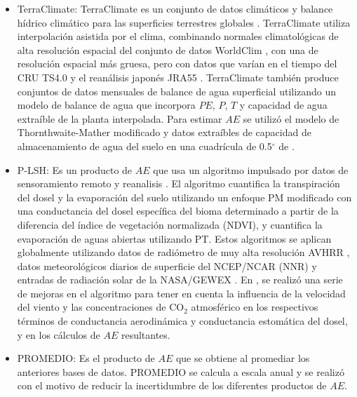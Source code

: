\documentclass[12pt]{article}
\begin{document}
\begin{itemize}
	\item TerraClimate: TerraClimate es un conjunto de datos climáticos y balance hídrico climático para las superficies terrestres globales \citep{abatzoglou2018terraclimate}. TerraClimate utiliza interpolación asistida por el clima, combinando normales climatológicas de alta resolución espacial del conjunto de datos WorldClim \citep{fick2017worldclim}, con una de resolución espacial más gruesa, pero con datos que varían en el tiempo del CRU TS4.0 \citep{harris2014updated} y el reanálisis japonés JRA55 \citep{kobayashi2015jra}. TerraClimate también produce conjuntos de datos mensuales de balance de agua superficial utilizando un modelo de balance de agua que incorpora $PE$, $P$, $T$ y capacidad de agua extraíble de la planta interpolada. Para estimar $AE$ se utilizó el modelo de Thornthwaite-Mather \citep{willmott1985climatology} modificado y datos extraíbles de capacidad de almacenamiento de agua del suelo en una cuadrícula de 0.5$^{\circ}$ de \citet{wang2016global}.
	
	\item P-LSH: Es un producto de $AE$ que usa un algoritmo impulsado por datos de sensoramiento remoto y reanalisis \citep{zhang2010continuous}. El algoritmo cuantifica la transpiración del dosel y la evaporación del suelo utilizando un enfoque PM modificado con una conductancia del dosel específica del bioma determinado a partir de la diferencia del índice de vegetación normalizada (NDVI), y cuantifica la evaporación de aguas abiertas utilizando PT. Estos algoritmos se aplican globalmente utilizando datos de radiómetro de muy alta resolución AVHRR \citep{tucker2005extended}, datos meteorológicos diarios de superficie del NCEP/NCAR (NNR) \citep{kistler2001ncep} y entradas de radiación solar de la NASA/GEWEX \citep{pinker1992modeling}. En \citet{zhang2015vegetation}, se realizó una serie de mejoras en el algoritmo para tener en cuenta la influencia de la velocidad del viento y las concentraciones de CO$_{2}$ atmosférico en los respectivos términos de conductancia aerodinámica y conductancia estomática del dosel, y en los cálculos de $AE$ resultantes.
	
	\item PROMEDIO: Es el producto de $AE$ que se obtiene al promediar los anteriores bases de datos. PROMEDIO se calcula a escala anual y se realizó con el motivo de reducir la incertidumbre de los diferentes productos de $AE$. 
	
\end{itemize}
\end{document}
